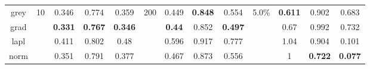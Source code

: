 \begin{table}[htbp]
\begin{tabular}{crrrrrrrrrrrr}
    \midrule
    
   
    grey  & \multicolumn{1}{r}{\multirow{4}[2]{*}{10}} & \multicolumn{1}{c}{0.346} & \multicolumn{1}{c}{0.774} & \multicolumn{1}{c}{0.359} & \multicolumn{1}{r}{\multirow{4}[2]{*}{200}} & \multicolumn{1}{c}{0.449} & \multicolumn{1}{c}{\textbf{0.848}} & \multicolumn{1}{c}{0.554} & \multicolumn{1}{r}{\multirow{4}[2]{*}{5.0\%}} & \multicolumn{1}{c}{\textbf{0.611}} & \multicolumn{1}{c}{0.902} & \multicolumn{1}{c}{0.683} \\
    grad  &       & \multicolumn{1}{c}{\textbf{0.331}} & \multicolumn{1}{c}{\textbf{0.767}} & \multicolumn{1}{c}{\textbf{0.346}} &       & \multicolumn{1}{c}{\textbf{0.44}} & \multicolumn{1}{c}{0.852} & \multicolumn{1}{c}{\textbf{0.497}} &       & \multicolumn{1}{c}{0.67} & \multicolumn{1}{c}{0.992} & \multicolumn{1}{c}{0.732} \\
    lapl  &       & \multicolumn{1}{c}{0.411} & \multicolumn{1}{c}{0.802} & \multicolumn{1}{c}{0.48} &       & \multicolumn{1}{c}{0.596} & \multicolumn{1}{c}{0.917} & \multicolumn{1}{c}{0.777} &       & \multicolumn{1}{c}{1.04} & \multicolumn{1}{c}{0.904} & \multicolumn{1}{c}{0.101} \\
    norm  &       & \multicolumn{1}{c}{0.351} & \multicolumn{1}{c}{0.791} & \multicolumn{1}{c}{0.377} &       & \multicolumn{1}{c}{0.467} & \multicolumn{1}{c}{0.873} & \multicolumn{1}{c}{0.556} &       & \multicolumn{1}{c}{1} & \multicolumn{1}{c}{\textbf{0.722}} & \multicolumn{1}{c}{\textbf{0.077}} \\
    
    \midrule
    

\end{tabular}
\end{table}
